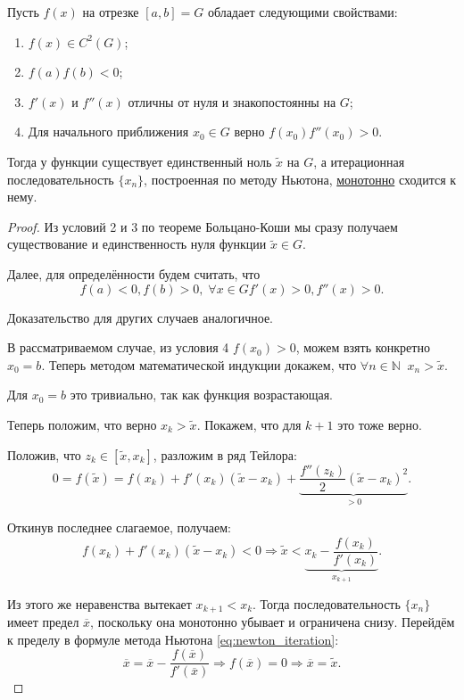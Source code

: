 \documentclass[../main.tex]{subfile}
\begin{document}
\begin{theorem}\label{eq:newton_cond}
	Пусть $f(x)$ на отрезке $[a,b]=G$ обладает следующими свойствами:
	\begin{enumerate}
		\item $f(x)\in C^2(G)$;
		\item $f(a)f(b)<0$;
		\item $f'(x)$ и $f''(x)$ отличны от нуля и знакопостоянны на $G$;
		\item Для начального приближения $x_0\in G$ верно
			$f(x_0)f''(x_0)>0$.
	\end{enumerate}

	Тогда у функции существует единственный ноль $\widetilde{x}$ на $G$, а
	итерационная последовательность $\{x_n\}$, построенная по методу
	Ньютона, \underline{монотонно} сходится к нему.
\end{theorem}

\begin{proof}
	Из условий 2 и 3 по теореме Больцано-Коши мы сразу получаем существование
	и единственность нуля функции $\widetilde{x}\in G$.

	Далее, для определённости будем считать, что
	\[f(a)<0, f(b)>0,\;\forall x\in G f'(x)>0, f''(x)>0.\]

	Доказательство для других случаев аналогичное.

	В рассматриваемом случае, из условия 4 $f(x_0)>0$, можем взять конкретно
	$x_0=b$. Теперь методом математической индукции докажем, что
	$\forall n\in \mathbb N\;\;x_n>\widetilde{x}$.

	Для $x_0=b$ это тривиально, так как функция возрастающая.

	Теперь положим, что верно $x_k>\widetilde{x}$. Покажем, что для $k+1$
	это тоже верно.

	Положив, что $z_k\in[\widetilde{x},x_k]$, разложим в ряд Тейлора:
	\[0=f(\widetilde{x})=f(x_k)+f'(x_k)(\widetilde{x}-x_k)+
		\underset{>0}{\underbrace{\frac{f''(z_k)}
		{2}(\widetilde{x}-x_k)^2}}.\]

	Откинув последнее слагаемое, получаем:
	\[f(x_k)+f'(x_k)(\widetilde{x}-x_k)<0\Rightarrow
		\widetilde{x}<\underset{x_{k+1}}{
			\underbrace{x_k-\frac{f(x_k)}{f'(x_k)}}}.\]

	Из этого же неравенства вытекает $x_{k+1}<x_k$. Тогда последовательность
	$\{x_n\}$ имеет предел $\overline{x}$, поскольку она монотонно убывает и
	ограничена снизу. Перейдём к пределу в формуле метода Ньютона
	\eqref{eq:newton_iteration}:
	\[\overline{x}=\overline{x}-\frac{f(\overline{x})}{f'(\overline{x})}
		\Rightarrow f(\overline{x})=0\Rightarrow \overline{x}=
		\widetilde{x}.\]
\end{proof}
\end{document}
